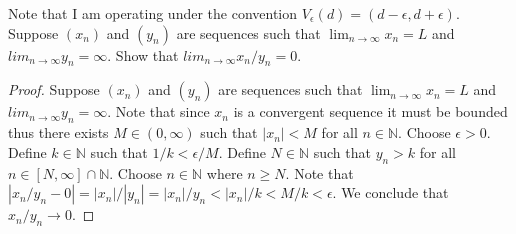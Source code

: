 \documentclass[12pt]{article}
\makeatletter
\theoremstyle{homework}
\newenvironment{exercise}[1]
{\def\@currentlabel{#1}\exercisecore}
{\endexercisecore}
\makeatother
\begin{document}
Note that I am operating under the convention $V_\epsilon(d)=(d-\epsilon,d+\epsilon)$.
\begin{exercise}
1
Suppose $(x_n)$ and $(y_n)$ are sequences such that $\lim_{n\rightarrow \infty} x_n = L$ and $lim_{n\rightarrow\infty} y_n =\infty$.  Show that $lim_{n\rightarrow\infty} x_n/y_n = 0$.
\end{exercise}
\begin{proof}
Suppose $(x_n)$ and $(y_n)$ are sequences such that $\lim_{n\rightarrow \infty} x_n = L$ and $lim_{n\rightarrow\infty} y_n =\infty$.  Note that since $x_n$ is a convergent sequence it must be bounded thus there exists $M\in(0,\infty)$ such that $|x_n|<M$ for all $n\in\mathbb{N}$.  Choose $\epsilon>0$.  Define $k\in\mathbb{N}$ such that $1/k<\epsilon/M$.  Define $N\in\mathbb{N}$ such that $y_n>k$ for all $n\in [N,\infty]\cap \mathbb{N}$.  Choose $n\in\mathbb{N}$ where $n\geq N$.  Note that $|x_n/y_n-0|=|x_n|/|y_n|=|x_n|/y_n<|x_n|/k<M/k<\epsilon$.  We conclude that $x_n/y_n\rightarrow 0$.
\end{proof}
\end{document}
